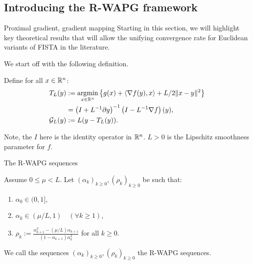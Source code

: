 \documentclass[11pt]{beamer}
\theoremstyle{definition}
\begin{document}
    \subsection{Introducing the R-WAPG framework}
        \begin{frame}{Proximal gradient, gradient mapping}
            Starting in this section, we will highlight key theoretical results that will allow the unifying convergence rate for Euclidean variants of FISTA in the literature.
            \par
            We start off with the following definition. 
            \begin{definition}
                Define for all $x\in \mathbb R^n$: 
                \begin{align*}
                    T_L(y) 
                    &:= \mathop{\rm argmin}\limits_{x \in \mathbb R^n} \left\lbrace
                        g(x) + \langle \nabla f(y), x\rangle + L/2\Vert x - y\Vert^2
                    \right\rbrace 
                    \\
                    &= \left(I + L^{-1}\partial g\right)^{-1}
                    \left(I - L^{-1}\nabla f\right)(y),
                    \\
                    \mathcal G_L(y)
                    &:= L(y - T_L(y)).
                \end{align*}
            \end{definition}
            Note, the $I$ here is the identity operator in $\mathbb R^n$. 
            $L > 0$ is the Lipschitz smoothness parameter for $f$. 
        \end{frame}
        \begin{frame}{The R-WAPG sequences}
            \begin{definition}\label{def:rwapg-seq}
                Assume $0 \le \mu < L$. 
                Let $(\alpha_k)_{k \ge 0}, (\rho_k)_{k \ge 0}$ be such that: 
                \begin{enumerate}
                    \item $\alpha_0 \in (0, 1]$, 
                    \item $\alpha_k \in (\mu/L, 1) \quad (\forall k \ge 1)$, 
                    \item $\rho_k := \frac{\alpha_{k + 1}^2 - (\mu/L) \alpha_{k + 1}}{(1 - \alpha_{k + 1}) \alpha_k^2}$ for all $k \ge 0$. 
                \end{enumerate}  
                We call the sequences $(\alpha_k)_{k \ge 0}, (\rho_k)_{k \ge0}$ the R-WAPG sequences. 
            \end{definition}
        \end{frame}
\end{document}
